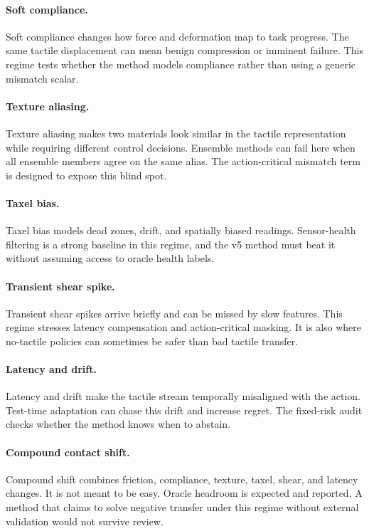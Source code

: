 \documentclass{article}
\begin{document}
\paragraph{Soft compliance.}
Soft compliance changes how force and deformation map to task progress. The same tactile displacement can mean benign compression or imminent failure. This regime tests whether the method models compliance rather than using a generic mismatch scalar.

\paragraph{Texture aliasing.}
Texture aliasing makes two materials look similar in the tactile representation while requiring different control decisions. Ensemble methods can fail here when all ensemble members agree on the same alias. The action-critical mismatch term is designed to expose this blind spot.

\paragraph{Taxel bias.}
Taxel bias models dead zones, drift, and spatially biased readings. Sensor-health filtering is a strong baseline in this regime, and the v5 method must beat it without assuming access to oracle health labels.

\paragraph{Transient shear spike.}
Transient shear spikes arrive briefly and can be missed by slow features. This regime stresses latency compensation and action-critical masking. It is also where no-tactile policies can sometimes be safer than bad tactile transfer.

\paragraph{Latency and drift.}
Latency and drift make the tactile stream temporally misaligned with the action. Test-time adaptation can chase this drift and increase regret. The fixed-risk audit checks whether the method knows when to abstain.

\paragraph{Compound contact shift.}
Compound shift combines friction, compliance, texture, taxel, shear, and latency changes. It is not meant to be easy. Oracle headroom is expected and reported. A method that claims to solve negative transfer under this regime without external validation would not survive review.
\end{document}
